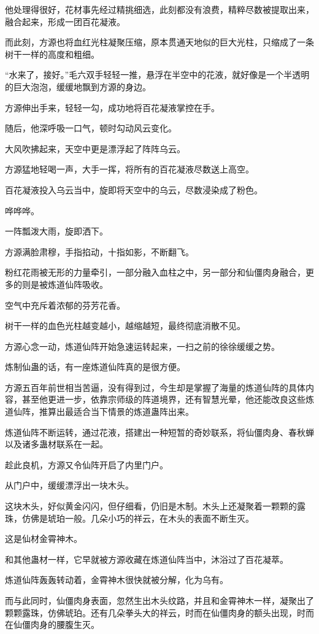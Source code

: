 \begin{this_body}
他处理得很好，花材事先经过精挑细选，此刻都没有浪费，精粹尽数被提取出来，融合起来，形成一团百花凝液。

而此刻，方源也将血红光柱凝聚压缩，原本贯通天地似的巨大光柱，只缩成了一条树干一样的高度和粗细。

“水来了，接好。”毛六双手轻轻一推，悬浮在半空中的花液，就好像是一个半透明的巨大泡泡，缓缓地飘到方源的身边。

方源伸出手来，轻轻一勾，成功地将百花凝液掌控在手。

随后，他深呼吸一口气，顿时勾动风云变化。

大风吹拂起来，天空中更是漂浮起了阵阵乌云。

方源猛地轻喝一声，大手一挥，将所有的百花凝液尽数送上高空。

百花凝液投入乌云当中，旋即将天空中的乌云，尽数浸染成了粉色。

哗哗哗。

一阵瓢泼大雨，旋即洒下。

方源满脸肃穆，手指掐动，十指如影，不断翻飞。

粉红花雨被无形的力量牵引，一部分融入血柱之中，另一部分和仙僵肉身融合，更多的则是被炼道仙阵吸收。

空气中充斥着浓郁的芬芳花香。

树干一样的血色光柱越变越小，越缩越短，最终彻底消散不见。

方源心念一动，炼道仙阵开始急速运转起来，一扫之前的徐徐缓缓之势。

炼制仙蛊的话，有一座炼道仙阵真的是很方便。

方源五百年前世相当苦逼，没有得到过，今生却是掌握了海量的炼道仙阵的具体内容，甚至他更进一步，依靠宗师级的阵道境界，还有智慧光晕，他还能改良这些炼道仙阵，推算出最适合当下情景的炼道蛊阵出来。

炼道仙阵不断运转，通过花液，搭建出一种短暂的奇妙联系，将仙僵肉身、春秋蝉以及诸多蛊材联系在一起。

趁此良机，方源又令仙阵开启了内里门户。

从门户中，缓缓漂浮出一块木头。

这块木头，好似黄金闪闪，但仔细看，仍旧是木制。木头上还凝聚着一颗颗的露珠，仿佛是琥珀一般。几朵小巧的祥云，在木头的表面不断生灭。

这是仙材金霄神木。

和其他蛊材一样，它早就被方源收藏在炼道仙阵当中，沐浴过了百花凝萃。

炼道仙阵轰轰转动着，金霄神木很快就被分解，化为乌有。

而与此同时，仙僵肉身表面，忽然生出木头纹路，并且和金霄神木一样，凝聚出了颗颗露珠，仿佛琥珀。还有几朵拳头大的祥云，时而在仙僵肉身的额头出现，时而在仙僵肉身的腰腹生灭。


\end{this_body}
